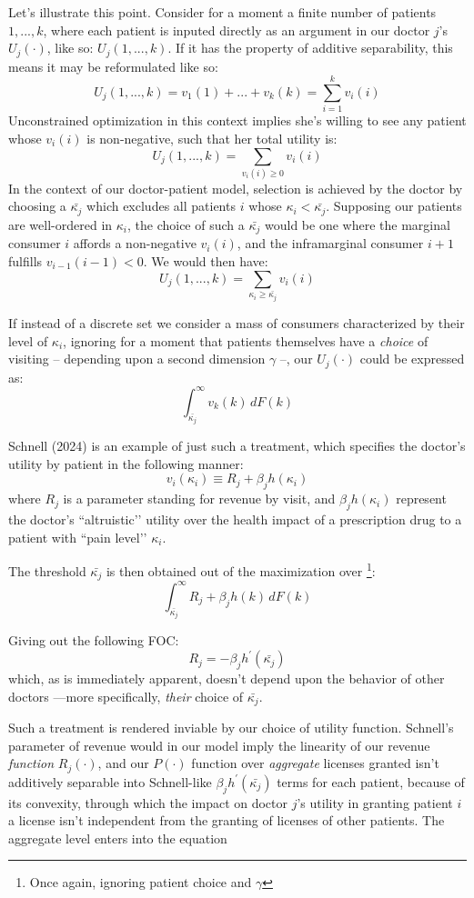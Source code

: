 \documentclass{article}
\begin{document}
Let’s illustrate this point. Consider for a moment a finite number of patients $1, ... , k$, where each patient is inputed directly as an argument in our doctor $j$’s $U_j(\cdot)$, like so: $U_j(1, ..., k)$. If it has the property of additive separability, this means it may be reformulated like so:
\[
U_j(1, ...,k) = v_1(1) + ... + v_k(k) = \sum_{i = 1}^{k} v_i(i)
\]
Unconstrained optimization in this context implies she’s willing to see any patient whose $v_i(i)$ is non-negative, such that her total utility is:
\[
U_j(1, ...,k) =  \sum_{v_i(i) \geq 0} v_i(i)
\]
In the context of our doctor-patient model, selection is achieved by the doctor by choosing a $\bar{\kappa_j}$ which excludes all patients $i$ whose $\kappa_i < \bar{\kappa_j}$. Supposing our patients are well-ordered in $\kappa_i$, the choice of such a $\bar{\kappa_j}$ would be one where the marginal consumer $i$ affords a non-negative $v_i(i)$, and the inframarginal consumer $i + 1$ fulfills $v_{i-1}(i-1) < 0$. We would then have:
\[
U_j(1, ...,k) =  \sum_{\kappa_i \geq \bar{\kappa_j}} v_i(i)
\]

If instead of a discrete set we consider a mass of consumers characterized by their level of $\kappa_i$, ignoring for a moment that patients themselves have a \textit{choice} of visiting -- depending upon a second dimension $\gamma$ --, our $U_j(\cdot)$ could be expressed as:
\[
\int_{\bar{\kappa_j}}^{\infty} v_k(k) \, dF(k)
\]

Schnell (2024) is an example of just such a treatment, which specifies the doctor’s utility by patient in the following manner:
\[
v_i(\kappa_i) \equiv R_j + \beta_j h(\kappa_i)
\]
where $R_j$ is a parameter standing for revenue by visit, and $\beta_j h(\kappa_i)$ represent the doctor’s ``altruistic’’ utility over the health impact of a prescription drug to a patient with ``pain level’’ $\kappa_i$.

The threshold $\bar{\kappa_j}$ is then obtained out of the maximization over \footnote{Once again, ignoring patient choice and $\gamma$}:
\[
\int_{\bar{\kappa_j}}^{\infty}  R_j + \beta_j h(k) \, dF(k)
\]

Giving out the following FOC:
\[
R_j = - \beta_j h^{\prime}(\bar{\kappa_j})
\]
which, as is immediately apparent, doesn’t depend upon the behavior of other doctors ---more specifically, \textit{their} choice of $\bar{\kappa_j}$.

Such a treatment is rendered inviable by our choice of utility function. Schnell’s parameter of revenue would in our model imply the linearity of our revenue \textit{function} $R_j(\cdot)$, and our $P(\cdot)$ function over \textit{aggregate} licenses granted isn’t additively separable into Schnell-like $\beta_j h^{\prime}(\bar{\kappa_j})$ terms for each patient, because of its convexity, through which the impact on doctor $j$’s utility in granting patient $i$ a license isn’t independent from the granting of licenses of other patients. The aggregate level enters into the equation
\end{document}

